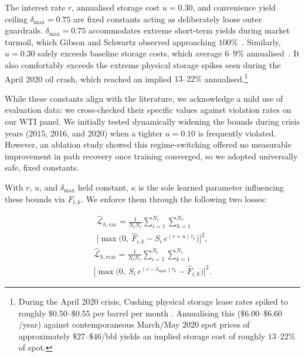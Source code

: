 \documentclass[sigconf, authorversion=true, nonacm=true]{acmart}
\begin{document}
The interest rate $r$, annualised storage cost $u = 0.30$, and convenience yield ceiling $\delta_{\max} = 0.75$ are fixed constants acting as deliberately loose outer guardrails. $\delta_{\max} = 0.75$ accommodates extreme short-term yields during market turmoil, which Gibson and Schwartz observed approaching $100\%$~\cite{Gibson1990StochasticClaims}. Similarly, $u = 0.30$ safely exceeds baseline storage costs, which average $6$--$9\%$ annualised~\cite{stancu2021dynamics, Fama1987CommodityStorage, byun2017speculation}. It also comfortably exceeds the extreme physical storage spikes seen during the April 2020 oil crash, which reached an implied $13$--$22\%$ annualised.\footnote{During the April 2020 crisis, Cushing physical storage lease rates spiked to roughly $\$0.50$--$\$0.55$ per barrel per month \cite{CME2020, Reuters2020}. Annualising this ($\$6.00$--$\$6.60$/year) against contemporaneous March/May 2020 spot prices of approximately $\$27$--$\$46$/bbl yields an implied storage cost of roughly $13$--$22\%$ of spot.}

While these constants align with the literature, we acknowledge a mild use of evaluation data: we cross-checked their specific values against violation rates on our WTI panel. We initially tested dynamically widening the bounds during crisis years (2015, 2016, and 2020) when a tighter $u=0.10$ is frequently violated. However, an ablation study showed this regime-switching offered no measurable improvement in path recovery once training converged, so we adopted universally safe, fixed constants.

With $r$, $u$, and $\delta_{\max}$ held constant, $\kappa$ is the sole learned parameter influencing these bounds via $\hat{F}_{i,k}$. We enforce them through the following two losses:


\begin{equation}
\begin{multlined}
\hat{\mathcal{L}}_{h,\text{cac}} = \frac{1}{N_t N_\tau} \sum_{i=1}^{N_t} \sum_{k=1}^{N_\tau} \\
\Big[ \max\!\Big( 0,\ \hat{F}_{i,k} - S_i\, e^{(r+u)\tau_k} \Big) \Big]^2,
\end{multlined}
\label{eq:cac-loss}
\end{equation}
\begin{equation}
\begin{multlined}
\hat{\mathcal{L}}_{h,\text{rcac}} = \frac{1}{N_t N_\tau} \sum_{i=1}^{N_t} \sum_{k=1}^{N_\tau} \\
\Big[ \max\!\Big( 0,\ S_i\, e^{(r - \delta_{\max})\tau_k} - \hat{F}_{i,k} \Big) \Big]^2.
\end{multlined}
\label{eq:rcac-loss}
\end{equation}
\end{document}

